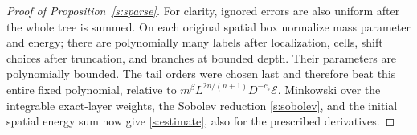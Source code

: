 \begin{proof}[Proof of Proposition~\ref{s:sparse}]
For clarity, ignored errors are also uniform after the whole tree is
summed.  On each original spatial box normalize mass parameter and
energy; there are polynomially many labels after localization, cells,
shift choices after truncation, and branches at bounded depth.  Their
parameters are polynomially bounded.  The tail orders were chosen last
and therefore beat this entire fixed polynomial, relative to
$m^\beta L^{2n/(n+1)}D^{-c_s}\mathcal E$.
Minkowski over the integrable exact-layer weights, the Sobolev reduction
\eqref{s:sobolev}, and the initial spatial energy sum now give
\eqref{s:estimate}, also for the prescribed derivatives.
\end{proof}
